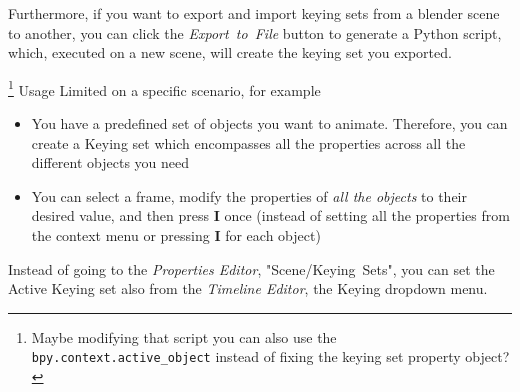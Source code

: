 \documentclass{article}
\begin{document}
Furthermore, if you want to export and import keying sets from a blender scene to another, you can click the \mbox{\textit{Export to File}} button to generate a Python script, which, executed on 
a new scene, will create the keying set you exported.\par\footnote{Maybe modifying that script you can also use the \texttt{bpy.context.active\_object} instead of fixing the keying set property object?}
Usage Limited on a specific scenario, for example
\begin{itemize}[topsep=0pt, noitemsep]
    \item You have a predefined set of objects you want to animate. Therefore, you can create a Keying set which encompasses all the properties across all the different objects you need
    \item You can select a frame, modify the properties of \textit{all the objects} to their desired value, and then press \textbf{I} once (instead of setting all the properties from the context 
    menu or pressing \textbf{I} for each object)
\end{itemize}
Instead of going to the \textit{Properties Editor}, \mbox{"Scene/Keying Sets"}, you can set the Active Keying set also from the \textit{Timeline Editor}, the Keying dropdown menu.
\end{document}
